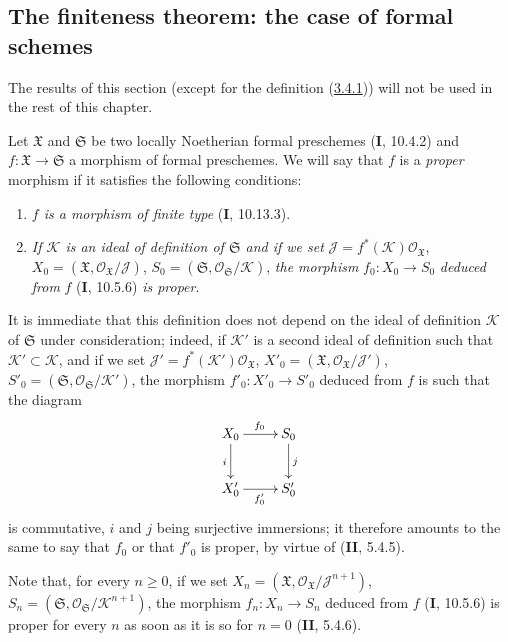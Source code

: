 \subsection{The finiteness theorem: the case of formal schemes}
\label{subsection:III.3.4}

The results of this section (except for the definition
(\hyperref[III.3.4.1]{3.4.1})) will not be used in the rest of this
chapter.

\begin{env}[3.4.1]
\label{III.3.4.1}
Let $\mathfrak X$ and $\mathfrak S$ be two locally Noetherian formal
preschemes (\textbf{I}, 10.4.2) and $f:\mathfrak X\to\mathfrak S$ a morphism of
formal preschemes. We will say that $f$ is a \emph{proper} morphism if it
satisfies the following conditions:
\begin{enumerate}
\item[$1^\circ$] \emph{$f$ is a morphism of finite type} (\textbf{I}, 10.13.3).
\item[$2^\circ$] \emph{If $\mathcal K$ is an ideal of definition of $\mathfrak S$
and if we set}
$\mathcal J=f^*(\mathcal K)\mathcal O_{\mathfrak X}$,
$X_0=(\mathfrak X,\mathcal O_{\mathfrak X}/\mathcal J)$,
$S_0=(\mathfrak S,\mathcal O_{\mathfrak S}/\mathcal K)$, \emph{the morphism}
$f_0:X_0\to S_0$ \emph{deduced from} $f$ (\textbf{I}, 10.5.6) \emph{is proper}.
\end{enumerate}

It is immediate that this definition does not depend on the ideal of
definition $\mathcal K$ of $\mathfrak S$ under consideration; indeed, if
$\mathcal K'$ is a second ideal of definition such that
$\mathcal K'\subset\mathcal K$, and if we set
$\mathcal J'=f^*(\mathcal K')\mathcal O_{\mathfrak X}$,
$X'_0=(\mathfrak X,\mathcal O_{\mathfrak X}/\mathcal J')$,
$S'_0=(\mathfrak S,\mathcal O_{\mathfrak S}/\mathcal K')$, the morphism
$f'_0:X'_0\to S'_0$ deduced from $f$ is such that the diagram
\[
\xymatrix{
X_0\ar[r]^{f_0}\ar[d]_i & S_0\ar[d]^j\\
X'_0\ar[r]_{f'_0} & S'_0
}
\]
is commutative, $i$ and $j$ being surjective immersions; it therefore amounts
to the same to say that $f_0$ or that $f'_0$ is proper, by virtue of (\textbf{II}, 5.4.5).

Note that, for every $n\geq0$, if we set
$X_n=(\mathfrak X,\mathcal O_{\mathfrak X}/\mathcal J^{n+1})$,
$S_n=(\mathfrak S,\mathcal O_{\mathfrak S}/\mathcal K^{n+1})$, the morphism
$f_n:X_n\to S_n$ deduced from $f$ (\textbf{I}, 10.5.6) is proper for every $n$ as soon
as it is so for $n=0$ (\textbf{II}, 5.4.6).


\end{env}
